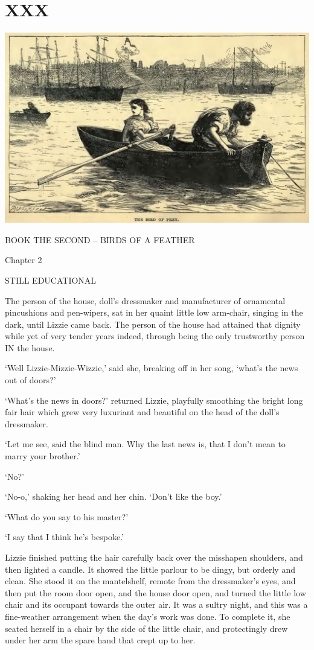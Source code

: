 
\chapter{XXX}

\includegraphics[scale=2.3]{01-01-01}

BOOK THE SECOND -- BIRDS OF A FEATHER



Chapter 2

STILL EDUCATIONAL


The person of the house, doll’s dressmaker and manufacturer of
ornamental pincushions and pen-wipers, sat in her quaint little low
arm-chair, singing in the dark, until Lizzie came back. The person
of the house had attained that dignity while yet of very tender years
indeed, through being the only trustworthy person IN the house.

‘Well Lizzie-Mizzie-Wizzie,’ said she, breaking off in her song, ‘what’s
the news out of doors?’

‘What’s the news in doors?’ returned Lizzie, playfully smoothing the
bright long fair hair which grew very luxuriant and beautiful on the
head of the doll’s dressmaker.

‘Let me see, said the blind man. Why the last news is, that I don’t mean
to marry your brother.’

‘No?’

‘No-o,’ shaking her head and her chin. ‘Don’t like the boy.’

‘What do you say to his master?’

‘I say that I think he’s bespoke.’

Lizzie finished putting the hair carefully back over the misshapen
shoulders, and then lighted a candle. It showed the little parlour to
be dingy, but orderly and clean. She stood it on the mantelshelf, remote
from the dressmaker’s eyes, and then put the room door open, and the
house door open, and turned the little low chair and its occupant
towards the outer air. It was a sultry night, and this was a
fine-weather arrangement when the day’s work was done. To complete
it, she seated herself in a chair by the side of the little chair, and
protectingly drew under her arm the spare hand that crept up to her.

